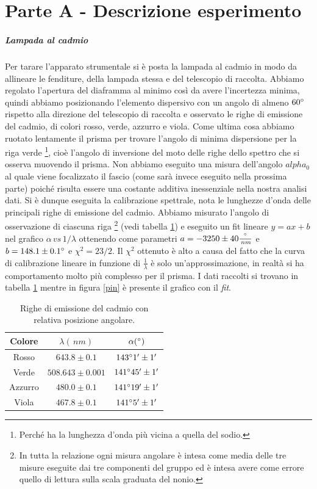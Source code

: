 \documentclass[10pt,a4paper]{article}
\begin{document}
\section{Parte A - Descrizione esperimento}
\subparagraph{Lampada al cadmio}
Per tarare l'apparato strumentale si è posta la lampada al cadmio in modo da allineare le fenditure, della lampada stessa e del telescopio di raccolta. Abbiamo regolato l'apertura del diaframma al minimo così da avere l'incertezza minima, quindi abbiamo posizionando l'elemento dispersivo con un angolo di almeno $60\degree$ rispetto alla direzione del telescopio di raccolta e osservato le righe di emissione del cadmio, di colori rosso, verde, azzurro e viola. Come ultima cosa abbiamo ruotato lentamente il prisma per trovare l'angolo di minima dispersione per la riga verde \footnote{Perché ha la lunghezza d'onda più vicina a quella del sodio.}, cioè l'angolo di inversione del moto delle righe dello spettro che si osserva muovendo il prisma. Non abbiamo eseguito una misura dell'angolo $alpha_0$ al quale viene focalizzato il fascio (come sarà invece eseguito nella prossima parte) poiché risulta essere una costante additiva inessenziale nella nostra analisi dati.
Si è dunque eseguita la calibrazione spettrale, nota le lunghezze d'onda delle principali righe di emissione del cadmio. Abbiamo misurato l'angolo di osservazione di ciascuna riga \footnote{In tutta la relazione ogni misura angolare è intesa come media delle tre misure eseguite dai tre componenti del gruppo ed è intesa avere come errore quello di lettura sulla scala graduata del nonio.} (vedi tabella \ref{cadmio}) e eseguito un fit lineare $y=ax+b$ nel grafico $\alpha\, \textit{vs}\, 1/\lambda$ ottenendo come parametri $a = -3250 \pm 40 \frac{\degree}{\,nm}$ e $ b = 148.1 \pm 0.1 \degree$ e $\chi^2=23/2$. Il $\chi^2$ ottenuto è alto a causa del fatto che la curva di calibrazione lineare in funzione di $\frac{1}{\lambda}$ è solo un'approssimazione, in realtà si ha comportamento molto più complesso per il prisma. I dati raccolti si trovano in tabella \ref{cadmio} mentre in figura \ref{pin} è presente il grafico con il \emph{fit}.

\begin{table}[!htb]
\centering
\begin{tabular}{|c|c|c|}
\hline 
Colore & $\lambda (\,nm)$ & $\alpha (\degree)$ \\
\hline
Rosso & $643.8\pm0.1$ & $143 \degree 1' \pm 1'$ \\ 
\hline 
Verde & $508.643 \pm 0.001$ & $141 \degree 45' \pm 1'$ \\ 
\hline 
Azzurro & $480.0 \pm 0.1$ & $141 \degree 19' \pm 1'$ \\ 
\hline 
Viola & $467.8 \pm 0.1$	& $141 \degree 5' \pm 1'$ \\ 
\hline 
\end{tabular} 
\caption{Righe di emissione del cadmio con relativa posizione angolare.}\label{cadmio}
\end{table}
\end{document}
